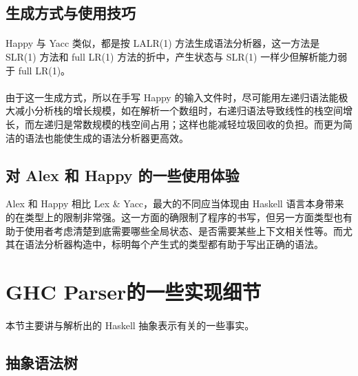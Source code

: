 \documentclass{article}
\begin{document}
 	\subsection{生成方式与使用技巧}
 	\paragraph{}
 	Happy 与 Yacc 类似，都是按 LALR(1) 方法生成语法分析器，这一方法是 SLR(1) 方法和 full LR(1) 方法的折中，产生状态与 SLR(1) 一样少但解析能力弱于 full LR(1)。
 	\paragraph{}
 	由于这一生成方式，所以在手写 Happy 的输入文件时，尽可能用左递归语法能极大减小分析栈的增长规模，如在解析一个数组时，右递归语法导致线性的栈空间增长，而左递归是常数规模的栈空间占用；这样也能减轻垃圾回收的负担。而更为简洁的语法也能使生成的语法分析器更高效。
 	\subsection{对 Alex 和 Happy 的一些使用体验}
 	Alex 和 Happy 相比 Lex \& Yacc，最大的不同应当体现由 Haskell 语言本身带来的在类型上的限制非常强。这一方面的确限制了程序的书写，但另一方面类型也有助于使用者考虑清楚到底需要哪些全局状态、是否需要某些上下文相关性等。而尤其在语法分析器构造中，标明每个产生式的类型都有助于写出正确的语法。
 	\section{GHC Parser的一些实现细节}
 	\paragraph{}
 	本节主要讲与解析出的 Haskell 抽象表示有关的一些事实。
 	\subsection{抽象语法树}
\end{document}
